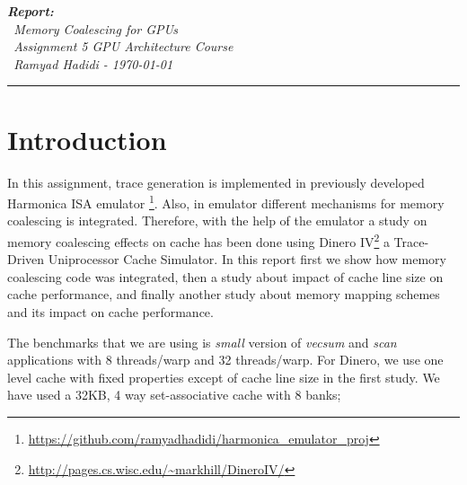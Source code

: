 \documentclass{article}
\author{Ramyad Hadidi}
\date{\today}
\begin{document}

	
\begin{minipage}[t]{1.0\textwidth}
 \emph{\indent\textbf{Report:} \\
		   \-\ Memory Coalescing for GPUs \\
		   \-\ Assignment 5 GPU Architecture Course \\
		   \-\ Ramyad Hadidi - \today
  }
\end{minipage}

\vspace{3 mm}
\hrule
\vspace{3 mm}

\section{Introduction}
In this assignment, trace generation is implemented in previously developed Harmonica ISA emulator \footnote{\url{https://github.com/ramyadhadidi/harmonica_emulator_proj}}. Also, in emulator different mechanisms for memory coalescing is integrated. Therefore, with the help of the emulator a study on memory coalescing effects on cache has been done using Dinero IV\footnote{\url{http://pages.cs.wisc.edu/~markhill/DineroIV/}} a Trace-Driven Uniprocessor Cache Simulator. In this report first we show how memory coalescing code was integrated, then a study about impact of cache line size on cache performance, and finally another study about memory mapping schemes and its impact on cache performance.

The benchmarks that we are using is \emph{small} version of \emph{vecsum} and \emph{scan} applications with 8 threads/warp and 32 threads/warp. For Dinero, we use one level cache with fixed properties except of cache line size in the first study. We have used a 32KB, 4 way set-associative cache with 8 banks;
\end{document}
